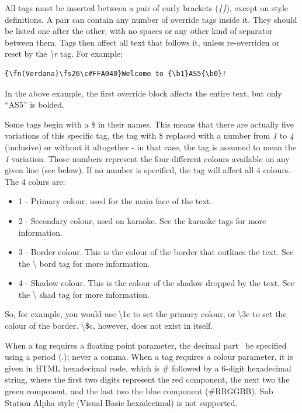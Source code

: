 \documentclass{spec}
\begin{document}
All tags must be inserted between a pair of curly brackets (\emph{\{\}}), except on style definitions.
A pair can contain any number of override tags inside it. They should be listed one after the other,
with no spaces or any other kind of separator between them. Tags then affect all text that follows
it, unless re-overriden or reset by the \emph{\textbackslash r} tag. For example:

\begin{verbatim}
{\fn(Verdana)\fs26\c#FFA040}Welcome to {\b1}AS5{\b0}!
\end{verbatim}

In the above example, the first override block affects the entire text, but only ``AS5'' is bolded.

Some tags begin with a \$ in their names. This means that there are actually five variations
of this specific tag, the tag with \$ replaced with a number from \emph{1} to \emph{4} (inclusive)
or without it altogether - in that case, the tag is assumed to mean the \emph{1} variation. Those
numbers represent the four different colours available on any given line (see below). If no number
is specified, the tag will affect all 4 colours. The 4 colurs are:

\begin{itemize}
\item 1 - Primary colour, used for the main face of the text.
\item 2 - Secondary colour, used on karaoke. See the karaoke tags for more information.
\item 3 - Border colour. This is the colour of the border that outlines the text. See the \textbackslash
bord tag for more information.
\item 4 - Shadow colour. This is the colour of the shadow dropped by the text. See the \textbackslash
shad tag for more information.
\end{itemize}

So, for example, you would use \textbackslash 1c to set the primary colour, or \textbackslash 3c to set
the colour of the border. \textbackslash \$c, however, does not exist in itself.

When a tag requires a floating point parameter, the decimal part \must\ be specified using a period (.);
never a comma. When a tag requires a colour parameter, it is given in HTML hexadecimal code, which is
\# followed by a 6-digit hexadecimal string, where the first two digits represent the red component,
the next two the green component, and the last two the blue component (\#RRGGBB). Sub Station Alpha
style (Visual Basic hexadecimal) is not supported.
\end{document}
